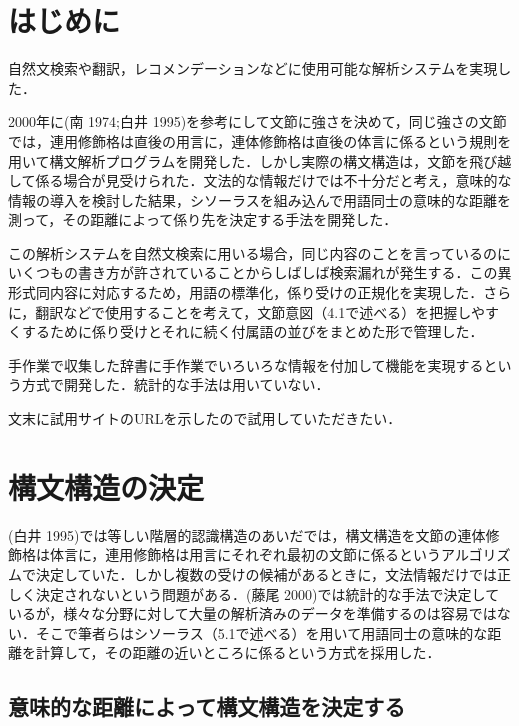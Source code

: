 \documentclass[japanese]{jnlp_1.4}
\begin{document}
\maketitle



\section{はじめに}

自然文検索や翻訳，レコメンデーションなどに使用可能な解析システムを実現した．

2000年に(南 1974;白井 1995)を参考にして文節に強さを決めて，同じ強さの文節では，連用修飾格は直後の用言に，連体修飾格は直後の体言に係るという規則を用いて構文解析プログラムを開発した．しかし実際の構文構造は，文節を飛び越して係る場合が見受けられた．文法的な情報だけでは不十分だと考え，意味的な情報の導入を検討した結果，シソーラスを組み込んで用語同士の意味的な距離を測って，その距離によって係り先を決定する手法を開発した．

この解析システムを自然文検索に用いる場合，同じ内容のことを言っているのにいくつもの書き方が許されていることからしばしば検索漏れが発生する．この異形式同内容に対応するため，用語の標準化，係り受けの正規化を実現した．さらに，翻訳などで使用することを考えて，文節意図（4.1で述べる）を把握しやすくするために係り受けとそれに続く付属語の並びをまとめた形で管理した．

手作業で収集した辞書に手作業でいろいろな情報を付加して機能を実現するという方式で開発した．統計的な手法は用いていない．

文末に試用サイトのURLを示したので試用していただきたい．



\section{構文構造の決定}

 (白井 1995)では等しい階層的認識構造のあいだでは，構文構造を文節の連体修飾格は体言に，連用修飾格は用言にそれぞれ最初の文節に係るというアルゴリズムで決定していた．しかし複数の受けの候補があるときに，文法情報だけでは正しく決定されないという問題がある．(藤尾 2000)では統計的な手法で決定しているが，様々な分野に対して大量の解析済みのデータを準備するのは容易ではない．そこで筆者らはシソーラス（5.1で述べる）を用いて用語同士の意味的な距離を計算して，その距離の近いところに係るという方式を採用した．


\subsection{意味的な距離によって構文構造を決定する}
\end{document}
